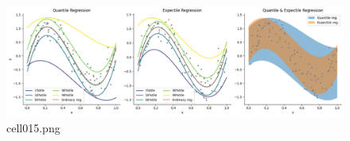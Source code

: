 \begin{figure}[ht]
	\centering
	\includegraphics[scale=0.8, max width=\linewidth]{./fig/bayesian-brain/quantile-expectile-regression/cell015.png}
	\caption{cell015.png}
	\label{cell015.png}
\end{figure}